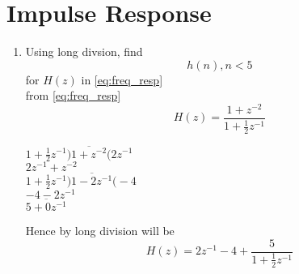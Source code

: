 \documentclass[journal,12pt,twocolumn]{IEEEtran}
\renewcommand\thesection{\arabic{section}}
\begin{document}
\section{Impulse Response}
\begin{enumerate}[label=\thesection.\arabic*]
	\item Using long divsion, find
	\begin{equation}
		h(n) , n<5
	\end{equation}
	for $H(z)$ in \eqref{eq:freq_resp} \\
	\solution from \eqref{eq:freq_resp}
	\begin{equation}
		H(z) = \frac{1 + z^{-2}}{1 + \frac{1}{2}z^{-1}}
	\end{equation}
	\begin{center}
		$1 + \frac{1}{2}z^{-1}\overline{)1 + z^{-2}(} 2z^{-1}$\\
		${2z^{-1} + z^{-2}}$\\
		$1 + \frac{1}{2}z^{-1}\overline{)1-2z^{-1}(} -4$\\
		$-4 - 2z^{-1}$\\
		$\overline{5 + 0z^{-1}}$
	\end{center}
	Hence by long division will be 
	\begin{equation}
		H(z) = 2z^{-1} -4 + \frac{5}{1 + \frac{1}{2}z^{-1}}
	\end{equation}
	

\end{enumerate}
\end{document}
